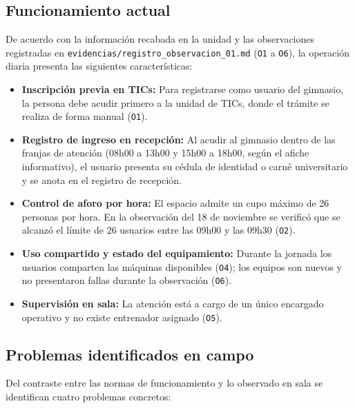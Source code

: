 \subsection{Funcionamiento actual}

De acuerdo con la información recabada en la unidad y las observaciones registradas en \texttt{evidencias/registro\_observacion\_01.md} (\texttt{O1} a \texttt{O6}), la operación diaria presenta las siguientes características:

\begin{itemize}
    \item \textbf{Inscripción previa en TICs:} Para registrarse como usuario del gimnasio, la persona debe acudir primero a la unidad de TICs, donde el trámite se realiza de forma manual (\texttt{O1}).
    \item \textbf{Registro de ingreso en recepción:} Al acudir al gimnasio dentro de las franjas de atención (08h00 a 13h00 y 15h00 a 18h00, según el afiche informativo), el usuario presenta su cédula de identidad o carné universitario y se anota en el registro de recepción.
    \item \textbf{Control de aforo por hora:} El espacio admite un cupo máximo de 26 personas por hora. En la observación del 18 de noviembre se verificó que se alcanzó el límite de 26 usuarios entre las 09h00 y las 09h30 (\texttt{O2}).
    \item \textbf{Uso compartido y estado del equipamiento:} Durante la jornada los usuarios comparten las máquinas disponibles (\texttt{O4}); los equipos son nuevos y no presentaron fallas durante la observación (\texttt{O6}).
    \item \textbf{Supervisión en sala:} La atención está a cargo de un único encargado operativo y no existe entrenador asignado (\texttt{O5}).
\end{itemize}

\subsection{Problemas identificados en campo}

Del contraste entre las normas de funcionamiento y lo observado en sala se identifican cuatro problemas concretos:

